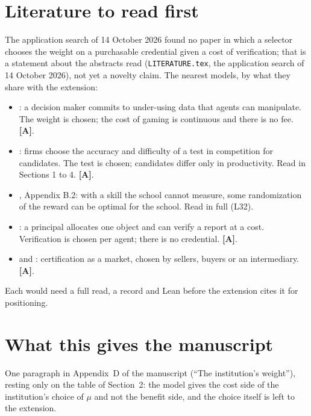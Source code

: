 \documentclass[11pt]{article}
\begin{document}
\section{Literature to read first}

The application search of 14 October 2026 found no paper in which a selector
chooses the weight on a purchasable credential given a cost of verification; that
is a statement about the abstracts read (\texttt{LITERATURE.tex}, the
application search of 14 October 2026), not yet a novelty claim. The nearest models, by what they
share with the extension:
\begin{itemize}
\item \citet{FrankelKartik2022}: a decision maker commits to under-using data
  that agents can manipulate. The weight is chosen; the cost of gaming is
  continuous and there is no fee. \textbf{[A]}.
\item \citet{Hancart2026}: firms choose the accuracy and difficulty of a test
  in competition for candidates. The test is chosen; candidates differ only in
  productivity. Read in Sections 1 to 4. \textbf{[A]}.
\item \citet{LiuGargBorgs2022}, Appendix B.2: with a skill the school cannot
  measure, some randomization of the reward can be optimal for the school.
  Read in full (L32).
\item \citet{BenPorathDekelLipman2014}: a principal allocates one object and
  can verify a report at a cost. Verification is chosen per agent; there is no
  credential. \textbf{[A]}.
\item \citet{StahlStrausz2017WP} and \citet{Lizzeri1999}: certification as a
  market, chosen by sellers, buyers or an intermediary. \textbf{[A]}.
\end{itemize}
Each would need a full read, a record and Lean before the extension cites it
for positioning.

\section{What this gives the manuscript}

One paragraph in Appendix~D of the manuscript (``The institution's weight''),
resting only on the table of Section~2: the model gives the cost side of the
institution's choice of $\mu$ and not the benefit side, and the choice itself is
left to the extension.



\end{document}
